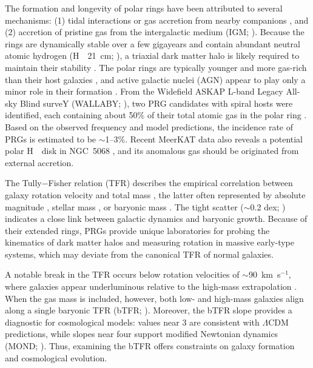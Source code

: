 \documentclass[twocolumn]{aastex631}
\def\HI{H\,  {\textsc{\romannumeral 1}}}
\begin{document}
The formation and longevity of polar rings have been attributed to several mechanisms: (1) tidal interactions or gas accretion from nearby companions \citep{Bournaud2003A&A...401..817B}, and (2) accretion of pristine gas from the intergalactic medium (IGM; \citealt{Whitmore1990AJ....100.1489W, Spavone2010ApJ...714.1081S, Moiseev2011MNRAS.418..244M}). Because the rings are dynamically stable over a few gigayears and contain abundant neutral atomic hydrogen (\HI\ 21~cm; \citealt{Richter1994AJ....107...99R}), a triaxial dark matter halo is likely required to maintain their stability \citep{Moiseev2015BaltA..24...76M}. The polar rings are typically younger and more gas-rich than their host galaxies \citep{Reshetnikov1997A&A...325..933R}, and active galactic nuclei (AGN) appear to play only a minor role in their formation \citep{Smirnov2020AstL...46..501S}. From the Widefield ASKAP L-band Legacy All-sky Blind surveY (WALLABY; \citealt{Koribalski2020Ap&SS.365..118K}), two PRG candidates with spiral hosts were identified, each containing about 50\% of their total atomic gas in the polar ring \citep{Deg2023MNRAS.525.4663D}.  Based on the observed frequency and model predictions, the incidence rate of PRGs is estimated to be $\sim$1--3\%. Recent MeerKAT data also reveals a potential polar \HI\ disk in NGC~5068 \citep{Healy2024A&A...687A.254H}, and its anomalous gas should be originated from external accretion.

The Tully$-$Fisher relation (TFR) describes the empirical correlation between galaxy rotation velocity and total mass \citep{Tully1977A&A....54..661T}, the latter often represented by absolute magnitude \citep{Giovanelli1997AJ....113...22G, Tully2013AJ....146...86T, Neill2014ApJ...792..129N}, stellar mass \citep{Bell2001ApJ...550..212B}, or baryonic mass \citep{McGaugh2000ApJ...533L..99M, Lelli2019MNRAS.484.3267L}. The tight scatter ($\sim$0.2 dex; \citealt{Bradford2016ApJ...832...11B}) indicates a close link between galactic dynamics and baryonic growth. Because of their extended rings, PRGs provide unique laboratories for probing the kinematics of dark matter halos and measuring rotation in massive early-type systems, which may deviate from the canonical TFR of normal galaxies.

A notable break in the TFR occurs below rotation velocities of $\sim$90~km~s$^{-1}$, where galaxies appear underluminous relative to the high-mass extrapolation \citep{McGaugh2000ApJ...533L..99M}. When the gas mass is included, however, both low- and high-mass galaxies align along a single baryonic TFR (bTFR; \citealt{McGaugh2000ApJ...533L..99M, McGaugh2005ApJ...632..859M}). Moreover, the bTFR slope provides a diagnostic for cosmological models: values near 3 are consistent with $\Lambda$CDM predictions, while slopes near four support modified Newtonian dynamics (MOND; \citealt{McGaugh2012AJ....143...40M}). Thus, examining the bTFR offers constraints on galaxy formation and cosmological evolution.
\end{document}

